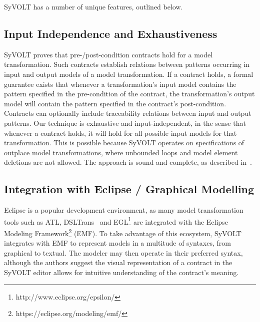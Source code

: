 SyVOLT has a number of unique features, outlined below.

\subsection{Input Independence and Exhaustiveness} 

SyVOLT proves that pre-/post-condition contracts hold for a model transformation.
Such contracts establish relations between patterns occurring in input and output
models of a model transformation. If a contract holds, a formal guarantee
exists that whenever a transformation's input model contains the pattern
specified in the pre-condition of the contract, the transformation's output model will contain
the pattern specified in the contract's post-condition. Contracts can 
optionally include traceability relations between input and output patterns. 
Our technique is exhaustive and input-independent, in the sense that whenever a contract holds, it
will hold for all possible input models for that transformation. This is possible
because SyVOLT operates on specifications of outplace model transformations,
where unbounded loops and model element deletions are not allowed. The approach is sound and complete, as described
in~\cite{Lucio2014}.




\subsection{Integration with Eclipse / Graphical Modelling}

Eclipse is a popular development environment, as many model transformation tools
such as ATL, DSLTrans~\cite{Barroca2011} and
EGL\footnote{http://www.eclipse.org/epsilon/} are integrated with the Eclipse
Modeling Framework\footnote{https://eclipse.org/modeling/emf/} (EMF). To take
advantage of this ecosystem, SyVOLT integrates with EMF to represent models in a
multitude of syntaxes, from graphical to textual. The modeler may then operate
in their preferred syntax, although the authors suggest the visual
representation of a contract in the SyVOLT editor allows for intuitive
understanding of the contract's meaning.




